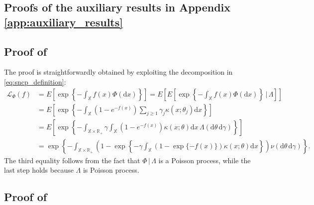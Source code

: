 \documentclass[11pt,a4paper,oneside]{article}
\newcommand{\dd}{\mathrm d}
\newcommand{\E}{E}
\newcommand{\X}{\mathbb{X}}
\newcommand{\R}{\mathbb{R}}
\renewcommand{\mid}{\ensuremath{\,|\,}}
\theoremstyle{definition}
\theoremstyle{remark}
\begin{document}
\subsection{Proofs of the auxiliary results in Appendix \ref{app:auxiliary_results}}\label{app:auxiliary_proofs}


\subsection*{Proof of }

The proof is straightforwardly obtained by exploiting the decomposition in \eqref{eq:sncp_definition}:
\begin{equation*}
    \begin{aligned}
        \mathcal{L}_{\Phi}(f) &= \E\left[ \exp\left\{ - \int_{\X} f(x) \Phi(\dd x) \right\} \right] = \E\left[ \E \left[ \exp\left\{ - \int_{\X} f(x) \Phi(\dd x) \right\} \mid \Lambda \right] \right]\\
        &= \E\left[ \exp\left\{ - \int_{\X} (1 - e^{-f(x)}) \sum_{j\geq 1} \gamma_j \kappa(x; \theta_j) \dd x \right\}\right]\\
        &= \E\left[ \exp\left\{ - \int_{\X\times\R_+} \gamma \int_{\X} (1 - e^{-f(x)}) \kappa(x; \theta) \dd x \, \Lambda(\dd \theta\, \dd \gamma) \right\}\right]\\
        &= \exp\left\{ - \int_{\X\times\R_+} \left( 1 - \exp\left\{ - \gamma \int_{\X} (1 - \exp\{-f(x)\}) \kappa(x; \theta) \dd x \right\} \right) \nu(\dd \theta\, \dd \gamma) \right\}.
    \end{aligned}
\end{equation*}
The third equality follows from the fact that $\Phi\mid \Lambda$ is a Poisson process, while the last step holds because $\Lambda$ is Poisson process.



\subsection*{Proof of }
\end{document}
